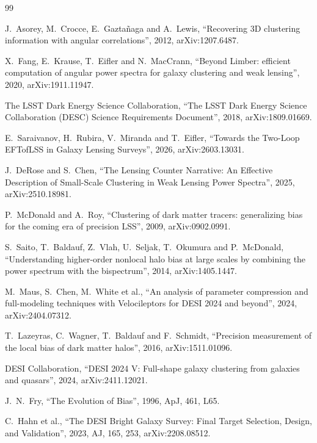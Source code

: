\documentclass[11pt]{article}
\begin{document}
\footnotesize
\raggedright
\begin{thebibliography}{99}
\setlength{\itemsep}{1pt}

J.~Asorey, M.~Crocce, E.~Gazta\~naga and A.~Lewis,
``Recovering 3D clustering information with angular correlations'',
2012, arXiv:1207.6487.

X.~Fang, E.~Krause, T.~Eifler and N.~MacCrann,
``Beyond Limber: efficient computation of angular power spectra for
galaxy clustering and weak lensing'',
2020, arXiv:1911.11947.

The LSST Dark Energy Science Collaboration,
``The LSST Dark Energy Science Collaboration (DESC) Science
Requirements Document'',
2018, arXiv:1809.01669.

E.~Saraivanov, H.~Rubira, V.~Miranda and T.~Eifler,
``Towards the Two-Loop EFTofLSS in Galaxy Lensing Surveys'',
2026, arXiv:2603.13031.

J.~DeRose and S.~Chen,
``The Lensing Counter Narrative: An Effective Description of
Small-Scale Clustering in Weak Lensing Power Spectra'',
2025, arXiv:2510.18981.

P.~McDonald and A.~Roy,
``Clustering of dark matter tracers: generalizing bias for the coming
era of precision LSS'',
2009, arXiv:0902.0991.

S.~Saito, T.~Baldauf, Z.~Vlah, U.~Seljak, T.~Okumura and P.~McDonald,
``Understanding higher-order nonlocal halo bias at large scales by
combining the power spectrum with the bispectrum'',
2014, arXiv:1405.1447.

M.~Maus, S.~Chen, M.~White et al.,
``An analysis of parameter compression and full-modeling techniques
with Velocileptors for DESI 2024 and beyond'',
2024, arXiv:2404.07312.

T.~Lazeyras, C.~Wagner, T.~Baldauf and F.~Schmidt,
``Precision measurement of the local bias of dark matter halos'',
2016, arXiv:1511.01096.

DESI Collaboration,
``DESI 2024 V: Full-shape galaxy clustering from galaxies and
quasars'',
2024, arXiv:2411.12021.

J.~N.~Fry,
``The Evolution of Bias'',
1996, ApJ, 461, L65.

C.~Hahn et al.,
``The DESI Bright Galaxy Survey: Final Target Selection, Design, and
Validation'',
2023, AJ, 165, 253,
arXiv:2208.08512.

\end{thebibliography}
\end{document}
